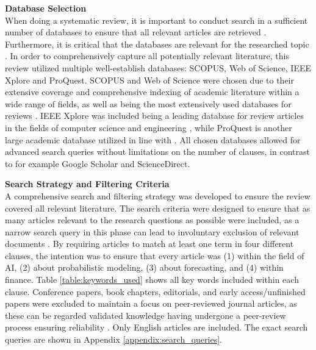 \textbf{Database Selection} \\
When doing a systematic review, it is important to conduct search in a sufficient number of databases to ensure that all relevant articles are retrieved \parencite{hiebl_2021}. Furthermore, it is critical that the databases are relevant for the researched topic \parencite{marzi_et_al_2024}. In order to comprehensively capture all potentially relevant literature, this review utilized multiple well-establish databases: SCOPUS, Web of Science, IEEE Xplore and ProQuest. SCOPUS and Web of Science were chosen due to their extensive coverage and comprehensive indexing of academic literature within a wide range of fields, as well as being the most extensively used databases for reviews \parencite{marzi_et_al_2024}. IEEE Xplore was included being a leading database for review articles in the fields of computer science and engineering \parencite{suhaimi2020systematic, carvalho2019systematic, cavacini2015best}, while ProQuest is another large academic database utilized in line with \textcite{gunnarsson2024}. All chosen databases allowed for advanced search queries without limitations on the number of clauses, in contrast to for example Google Scholar and ScienceDirect. 

\textbf{Search Strategy and Filtering Criteria} \\
A comprehensive search and filtering strategy was developed to ensure the review covered all relevant literature. The search criteria were designed to ensure that as many articles relevant to the research questions as possible were included, as a narrow search query in this phase can lead to involuntary exclusion of relevant documents \parencite{marzi_et_al_2024,kuhrmann2017pragmatic, williams2021reexamining}. By requiring articles to match at least one term in four different clauses, the intention was to ensure that every article was (1) within the field of AI, (2) about probabilistic modeling, (3) about forecasting, and (4) within finance. Table \ref{table:keywords_used} shows all key words included within each clause. Conference papers, book chapters, editorials, and early access/unfinished papers were excluded to maintain a focus on peer-reviewed journal articles, as these can be regarded validated knowledge having undergone a peer-review process ensuring reliability \parencite{marzi_et_al_2024, hota2022hybrid}. Only English articles are included. The exact search queries are shown in Appendix \ref{appendix:search_queries}. 

